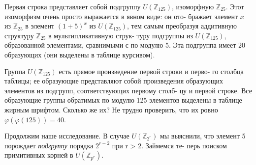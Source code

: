 Первая строка представляет собой подгруппу $U(\mathbb{Z}_{125})$, изоморфную \linebreak $\mathbb{Z}_{25}$. Этот изоморфизм очень просто выражается в явном виде: он ото- \linebreak бражает элемент $x$ из $\mathbb{Z}_{25}$ в элемент $(1+5)^x$ из $U(\mathbb{Z}_{125})$, тем самым \linebreak преобразуя аддитивную структуру $\mathbb{Z}_{25}$ в мультипликативную струк- \linebreak туру подгруппы из $U(\mathbb{Z}_{125})$, образованной элементами, сравнимыми с  по модулю 5. Эта подгруппа имеет 20 образующих (они выделены в \linebreak таблице курсивом). \par 
Группа $U(\mathbb{Z}_{125})$ есть прямое произведение первой строки и перво- \linebreak го столбца таблицы; ее образующие представляют собой произведения \linebreak образующих элементов из подгрупп, соответствующих первому столб- \linebreak цу и первой строке. Все образующие группы обратимых по модулю 125 \linebreak элементов выделены в таблице жирным шрифтом. Сколько же их? Не \linebreak трудно проверить, что их ровно $\varphi(\varphi(125)) = 40.$ \par
\vspace{\baselineskip}
Продолжим наше исследование. В случае $U(\mathbb{Z}_{{2}^{r}})$ мы выяснили, что \linebreak элемент 5 порождает \textit{подгруппу}  порядка $2^{r-2}$ при r > 2. Займемся те- \linebreak перь поиском примитивных корней в $U(\mathbb{Z}_{{p}^r}).$ \par

